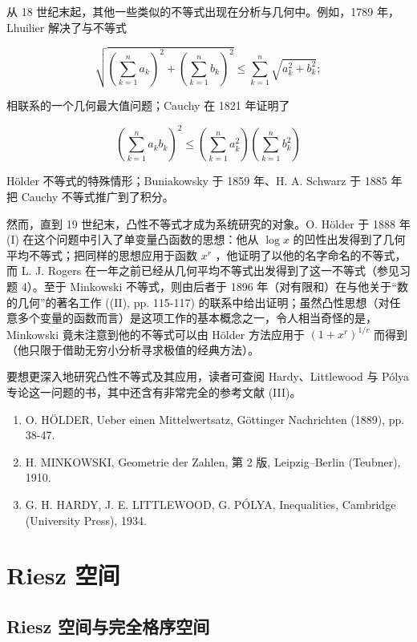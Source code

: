 从 18 世纪末起，其他一些类似的不等式出现在分析与几何中。例如，1789 年，Lhuilier 解决了与不等式

\[
\sqrt {\left(\sum_ {k = 1} ^ {n} a _ {k}\right) ^ {2} + \left(\sum_ {k = 1} ^ {n} b _ {k}\right) ^ {2}} \leqslant \sum_ {k = 1} ^ {n} \sqrt {a _ {k} ^ {2} + b _ {k} ^ {2}};
\]

相联系的一个几何最大值问题；Cauchy 在 1821 年证明了

\[
\left(\sum_ {k = 1} ^ {n} a _ {k} b _ {k}\right) ^ {2} \leqslant \left(\sum_ {k = 1} ^ {n} a _ {k} ^ {2}\right) \left(\sum_ {k = 1} ^ {n} b _ {k} ^ {2}\right)
\]

Hölder 不等式的特殊情形；Buniakowsky 于 1859 年、H. A. Schwarz 于 1885 年把 Cauchy 不等式推广到了积分。

然而，直到 19 世纪末，凸性不等式才成为系统研究的对象。O. Hölder 于 1888 年 (I) 在这个问题中引入了单变量凸函数的思想：他从 \(\log x\) 的凹性出发得到了几何平均不等式；把同样的思想应用于函数 \(x^{r}\) ，他证明了以他的名字命名的不等式，而 L. J. Rogers 在一年之前已经从几何平均不等式出发得到了这一不等式（参见习题 4）。至于 Minkowski 不等式，则由后者于 1896 年（对有限和）在与他关于“数的几何”的著名工作 ((II), pp. 115-117) 的联系中给出证明；虽然凸性思想（对任意多个变量的函数而言）是这项工作的基本概念之一，令人相当奇怪的是，Minkowski 竟未注意到他的不等式可以由 Hölder 方法应用于 \((1 + x^{r})^{1 / r}\) 而得到（他只限于借助无穷小分析寻求极值的经典方法）。

要想更深入地研究凸性不等式及其应用，读者可查阅 Hardy、Littlewood 与 Pólya 专论这一问题的书，其中还含有非常完全的参考文献 (III)。

\begin{enumerate}
\def\labelenumi{(\Roman{enumi})}
\item
  O. HÖLDER, Ueber einen Mittelwertsatz, Göttinger Nachrichten (1889), pp. 38-47.
\item
  H. MINKOWSKI, Geometrie der Zahlen, 第 2 版, Leipzig--Berlin (Teubner), 1910.
\item
  G. H. HARDY, J. E. LITTLEWOOD, G. PÓLYA, Inequalities, Cambridge (University Press), 1934.
\end{enumerate}

\chapter{Riesz 空间}

\section{Riesz 空间与完全格序空间}

